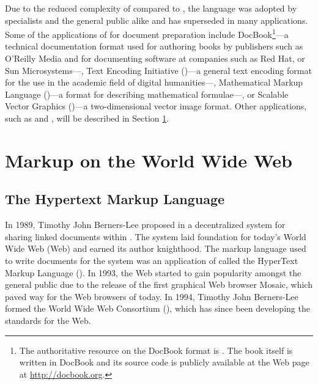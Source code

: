 \documentclass{book}
\begin{document}
        Due to the reduced complexity of  compared to
        , the language was adopted by specialists and the general
        public alike and has superseded  in many applications.
        Some of the applications of  for document
        preparation include DocBook\footnote{
          The authoritative resource on the DocBook  format is
          \cite{walsh10}. The book itself is written in DocBook and its source
          code is publicly available at the Web page at
          \url{http://docbook.org}.
        }---a technical documentation format used for authoring books by
        publishers such as O'Reilly Media and for documenting software at
        companies such as Red Hat,  or Sun Microsystems---,
        Text Encoding Initiative ()---a general text encoding
        format for the use in the academic field of digital humanities---,
        Mathematical Markup Language ()---a format for
        describing mathematical formulae---, or Scalable Vector Graphics
        ()---a two-dimensional vector image format. Other
         applications, such as  and
        , will be described in Section \ref{sec:www-markup}.
        
      \section{Markup on the World Wide Web}\label{sec:www-markup}
      \subsection{The Hypertext Markup Language}
        In 1989, Timothy John Berners-Lee proposed in \cite{bernerslee89} a
        decentralized system for sharing linked documents within .
        The system laid foundation for today's World Wide Web (Web) and earned
        its author knighthood. The markup language used to write documents for
        the system was an application of  called the HyperText
        Markup Language (). In 1993, the Web started to gain
        popularity amongst the general public due to the release of the first
        graphical Web browser Mosaic, which paved way for the Web browsers of
        today. In 1994, Timothy John Berners-Lee formed the World Wide Web
        Consortium (), which has since been developing the
        standards for the Web.
        
\end{document}
